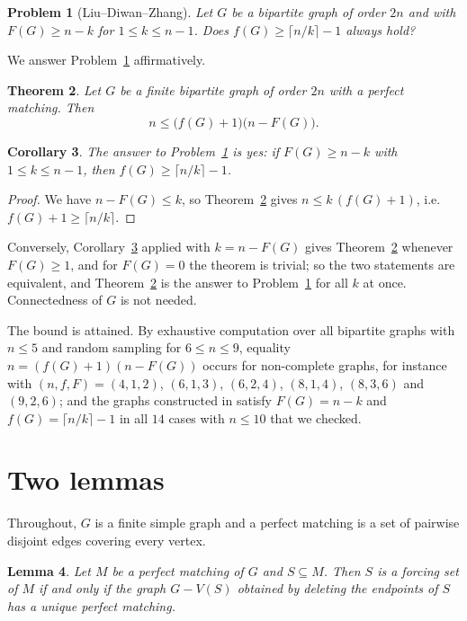 \documentclass[11pt]{amsart}
\newtheorem{theorem}{Theorem}[section]
\newtheorem{lemma}[theorem]{Lemma}
\newtheorem{corollary}[theorem]{Corollary}
\newtheorem{problem}[theorem]{Problem}
\theoremstyle{remark}
\begin{document}
\begin{problem}[Liu--Diwan--Zhang]\label{prob}
Let $G$ be a bipartite graph of order $2n$ and with $F(G)\ge n-k$ for $1\le k\le n-1$.
Does $f(G)\ge\lceil n/k\rceil-1$ always hold?
\end{problem}

We answer Problem~\ref{prob} affirmatively.

\begin{theorem}\label{thm:main}
Let $G$ be a finite bipartite graph of order $2n$ with a perfect matching.
Then
\[
n\le\bigl(f(G)+1\bigr)\bigl(n-F(G)\bigr).
\]
\end{theorem}

\begin{corollary}\label{cor}
The answer to Problem~\ref{prob} is yes: if $F(G)\ge n-k$ with $1\le k\le n-1$, then $f(G)\ge\lceil n/k\rceil-1$.
\end{corollary}

\begin{proof}
We have $n-F(G)\le k$, so Theorem~\ref{thm:main} gives $n\le k\,(f(G)+1)$, i.e.\ $f(G)+1\ge\lceil n/k\rceil$.
\end{proof}

Conversely, Corollary~\ref{cor} applied with $k=n-F(G)$ gives Theorem~\ref{thm:main} whenever $F(G)\ge1$, and for $F(G)=0$ the theorem is trivial; so the two statements are equivalent, and Theorem~\ref{thm:main} is the answer to Problem~\ref{prob} for all $k$ at once.
Connectedness of $G$ is not needed.

The bound is attained.
By exhaustive computation over all bipartite graphs with $n\le 5$ and random sampling for $6\le n\le 9$, equality $n=(f(G)+1)(n-F(G))$ occurs for non-complete graphs, for instance with $(n,f,F)=(4,1,2)$, $(6,1,3)$, $(6,2,4)$, $(8,1,4)$, $(8,3,6)$ and $(9,2,6)$; and the graphs constructed in \cite[Remark~5.6]{LDZ} satisfy $F(G)=n-k$ and $f(G)=\lceil n/k\rceil-1$ in all $14$ cases with $n\le 10$ that we checked.

\section{Two lemmas}

Throughout, $G$ is a finite simple graph and a perfect matching is a set of pairwise disjoint edges covering every vertex.

\begin{lemma}\label{lem:forcing}
Let $M$ be a perfect matching of $G$ and $S\subseteq M$.
Then $S$ is a forcing set of $M$ if and only if the graph $G-V(S)$ obtained by deleting the endpoints of $S$ has a unique perfect matching.
\end{lemma}
\end{document}
